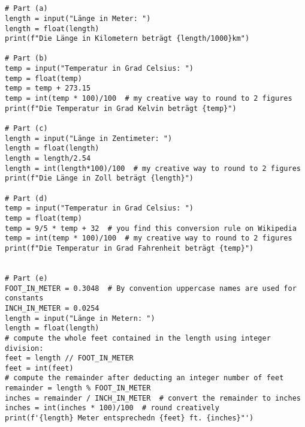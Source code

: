 \documentclass[a4paper]{article}
\begin{document}
\section{}
\begin{verbatim}
# Part (a)
length = input("Länge in Meter: ")
length = float(length)
print(f"Die Länge in Kilometern beträgt {length/1000}km")

# Part (b)
temp = input("Temperatur in Grad Celsius: ")
temp = float(temp)
temp = temp + 273.15
temp = int(temp * 100)/100  # my creative way to round to 2 figures
print(f"Die Temperatur in Grad Kelvin beträgt {temp}")

# Part (c)
length = input("Länge in Zentimeter: ")
length = float(length)
length = length/2.54
length = int(length*100)/100  # my creative way to round to 2 figures
print(f"Die Länge in Zoll beträgt {length}")

# Part (d)
temp = input("Temperatur in Grad Celsius: ")
temp = float(temp)
temp = 9/5 * temp + 32  # you find this conversion rule on Wikipedia
temp = int(temp * 100)/100  # my creative way to round to 2 figures
print(f"Die Temperatur in Grad Fahrenheit beträgt {temp}")


# Part (e)
FOOT_IN_METER = 0.3048  # By convention uppercase names are used for constants
INCH_IN_METER = 0.0254
length = input("Länge in Metern: ")
length = float(length)
# compute the whole feet contained in the length using integer division:
feet = length // FOOT_IN_METER  
feet = int(feet)
# compute the remainder after deducting an integer number of feet
remainder = length % FOOT_IN_METER  
inches = remainder / INCH_IN_METER  # convert the remainder to inches
inches = int(inches * 100)/100  # round creatively
print(f'{length} Meter entsprechedn {feet} ft. {inches}"')
\end{verbatim}
\end{document}
